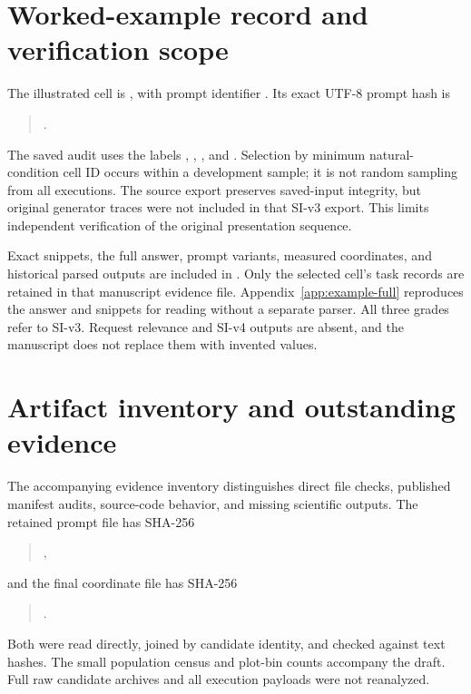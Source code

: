 \section{Worked-example record and verification scope}
\label{app:example}
The illustrated cell is , with prompt identifier . Its exact UTF-8 prompt hash is
\begin{quote}\small{}.\end{quote}
The saved audit uses the labels , , , and . Selection by minimum natural-condition cell ID occurs within a development sample; it is not random sampling from all executions. The source export preserves saved-input integrity, but original generator traces were not included in that SI-v3 export. This limits independent verification of the original presentation sequence.

Exact snippets, the full answer, prompt variants, measured coordinates, and historical parsed outputs are included in . Only the selected cell's task records are retained in that manuscript evidence file. Appendix~\ref{app:example-full} reproduces the answer and snippets for reading without a separate parser. All three grades refer to SI-v3. Request relevance and SI-v4 outputs are absent, and the manuscript does not replace them with invented values.

\section{Artifact inventory and outstanding evidence}
\label{app:artifacts}
The accompanying evidence inventory distinguishes direct file checks, published manifest audits, source-code behavior, and missing scientific outputs. The retained prompt file has SHA-256
\begin{quote}\small{},\end{quote}
and the final coordinate file has SHA-256
\begin{quote}\small{}.\end{quote}
Both were read directly, joined by candidate identity, and checked against text hashes. The small population census and plot-bin counts accompany the draft. Full raw candidate archives and all execution payloads were not reanalyzed.

